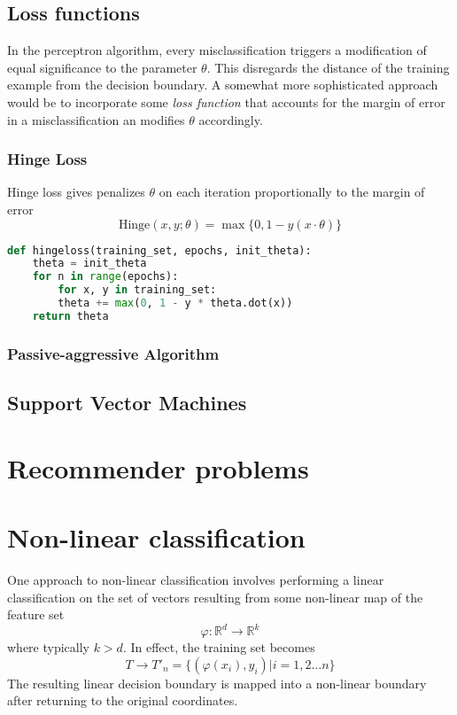 \documentclass{article}
\theoremstyle{definition}
\theoremstyle{remark}
\begin{document}
\subsection{Loss functions}
In the perceptron algorithm, every misclassification triggers a modification of equal significance to the parameter $\theta$. 
This disregards the distance of the training example from the decision boundary.
A somewhat more sophisticated approach would be to incorporate some \textit{loss function} that accounts for the margin of error in a misclassification an modifies $\theta$ accordingly.

\subsubsection{Hinge Loss}
Hinge loss gives penalizes $\theta$ on each iteration proportionally to the margin of error
\begin{equation}
  \text{Hinge}(x, y; \theta) = \max\{0, 1 - y(x\cdot\theta)\}
  \label{eqn:hingeloss}
\end{equation}
\begin{lstlisting}[language=Python]
def hingeloss(training_set, epochs, init_theta):
    theta = init_theta
    for n in range(epochs):
        for x, y in training_set:
	    theta += max(0, 1 - y * theta.dot(x))
    return theta
\end{lstlisting}
\subsubsection{Passive-aggressive Algorithm}
\subsection{Support Vector Machines}

\section{Recommender problems}

\section{Non-linear classification}
One approach to non-linear classification involves performing a linear classification on the set of vectors resulting from some non-linear map of the feature set
\begin{equation}
  \varphi : \mathbb{R}^{d} \rightarrow \mathbb{R}^{k}
  \label{eqn:nonlinearmap}
\end{equation}
where typically $k > d$.
In effect, the training set becomes
\begin{equation}
  T \rightarrow T'_{n} = \{(\varphi(x_{i}), y_{i})|i = 1, 2 \dots n\}
  \label{eqn:modtrainingset}
\end{equation}
The resulting linear decision boundary is mapped into a non-linear boundary after returning to the original coordinates.
\end{document}
